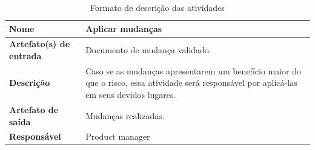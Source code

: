 \begin{table}[h]
    \centering
    \label{descricaoAtividades}
    \caption{Formato de descrição das atividades}
        \begin{tabular}{|l|p{10cm}|}
        \hline
        \textbf{Nome} & Aplicar mudanças \\
        \hline
        \textbf{Artefato(s) de entrada} & Documento de mudança validado. \\
        \hline
        \textbf{Descrição} & Caso se as mudanças apresentarem um benefício maior do que o risco, essa atividade será responsável por aplicá-las em seus devidos lugares. \\
        \hline
        \textbf{Artefato de saída} & Mudanças realizadas. \\
        \hline
        \textbf{Responsável} & Product manager \\
        \hline
    \end{tabular}
\end{table}

